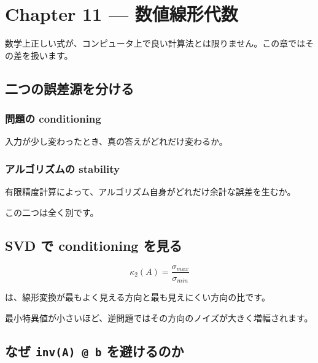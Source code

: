 \documentclass[
  11pt,
  a4paper,
]{ltjsarticle}
\author{}
\date{}
\begin{document}
\hypertarget{chapter-11-ux6570ux5024ux7ddaux5f62ux4ee3ux6570}{%
\section{Chapter 11 ---
数値線形代数}\label{chapter-11-ux6570ux5024ux7ddaux5f62ux4ee3ux6570}}

数学上正しい式が、コンピュータ上で良い計算法とは限りません。この章ではその差を扱います。

\hypertarget{ux4e8cux3064ux306eux8aa4ux5deeux6e90ux3092ux5206ux3051ux308b}{%
\subsection{二つの誤差源を分ける}\label{ux4e8cux3064ux306eux8aa4ux5deeux6e90ux3092ux5206ux3051ux308b}}

\hypertarget{ux554fux984cux306e-conditioning}{%
\subsubsection{問題の
conditioning}\label{ux554fux984cux306e-conditioning}}

入力が少し変わったとき、真の答えがどれだけ変わるか。

\hypertarget{ux30a2ux30ebux30b4ux30eaux30baux30e0ux306e-stability}{%
\subsubsection{アルゴリズムの
stability}\label{ux30a2ux30ebux30b4ux30eaux30baux30e0ux306e-stability}}

有限精度計算によって、アルゴリズム自身がどれだけ余計な誤差を生むか。

この二つは全く別です。

\hypertarget{svd-ux3067-conditioning-ux3092ux898bux308b}{%
\subsection{SVD で conditioning
を見る}\label{svd-ux3067-conditioning-ux3092ux898bux308b}}

\[
\kappa_2(A)=\frac{\sigma_{max}}{\sigma_{min}}
\]

は、線形変換が最もよく見える方向と最も見えにくい方向の比です。

最小特異値が小さいほど、逆問題ではその方向のノイズが大きく増幅されます。

\hypertarget{ux306aux305c-inva-b-ux3092ux907fux3051ux308bux306eux304b}{%
\subsection{\texorpdfstring{なぜ \texttt{inv(A)\ @\ b}
を避けるのか}{なぜ inv(A) @ b を避けるのか}}\label{ux306aux305c-inva-b-ux3092ux907fux3051ux308bux306eux304b}}
\end{document}
